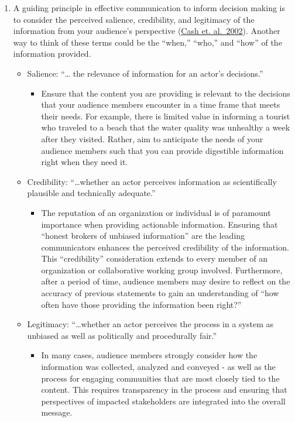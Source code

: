 \documentclass[
]{book}
\providecommand{\tightlist}{%
  \setlength{\itemsep}{0pt}\setlength{\parskip}{0pt}}
\begin{document}
\begin{enumerate}
\def\labelenumi{\arabic{enumi}.}
\tightlist
\item
  A guiding principle in effective communication to inform decision making is to consider the perceived salience, credibility, and legitimacy of the information from your audience's perspective (\href{https://dash.harvard.edu/bitstream/handle/1/32067415/Salience_credibility.pdf?sequence=4}{Cash et. al.~2002}). Another way to think of these terms could be the ``when,'' ``who,'' and ``how'' of the information provided.

  \begin{itemize}
  \tightlist
  \item
    Salience: ``\ldots{} the relevance of information for an actor's decisions.''

    \begin{itemize}
    \tightlist
    \item
      Ensure that the content you are providing is relevant to the decisions that your audience members encounter in a time frame that meets their needs. For example, there is limited value in informing a tourist who traveled to a beach that the water quality was unhealthy a week after they visited. Rather, aim to anticipate the needs of your audience members such that you can provide digestible information right when they need it.
    \end{itemize}
  \item
    Credibility: ``\ldots whether an actor perceives information as scientifically plausible and technically adequate.''

    \begin{itemize}
    \tightlist
    \item
      The reputation of an organization or individual is of paramount importance when providing actionable information. Ensuring that ``honest brokers of unbiased information'' are the leading communicators enhances the perceived credibility of the information. This ``credibility'' consideration extends to every member of an organization or collaborative working group involved. Furthermore, after a period of time, audience members may desire to reflect on the accuracy of previous statements to gain an understanding of ``how often have those providing the information been right?''
    \end{itemize}
  \item
    Legitimacy: ``\ldots whether an actor perceives the process in a system as unbiased as well as politically and procedurally fair.''

    \begin{itemize}
    \tightlist
    \item
      In many cases, audience members strongly consider how the information was collected, analyzed and conveyed - as well as the process for engaging communities that are most closely tied to the content. This requires transparency in the process and ensuring that perspectives of impacted stakeholders are integrated into the overall message.
    \end{itemize}
  \end{itemize}
\end{enumerate}
\end{document}
